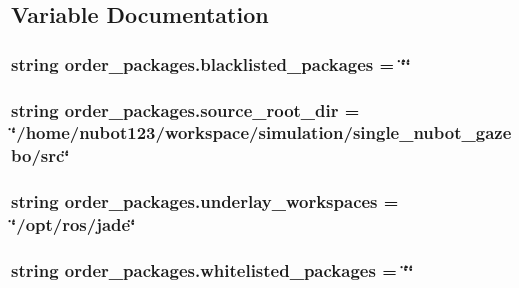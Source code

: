 \subsection{Variable Documentation}
\hypertarget{namespaceorder__packages_a29ea913f00c5a0e81d3c7688e7375507}{
\subsubsection[{blacklisted\-\_\-packages}]{\setlength{\rightskip}{0pt plus 5cm}string order\-\_\-packages.\-blacklisted\-\_\-packages = \char`\"{}\char`\"{}}}\label{namespaceorder__packages_a29ea913f00c5a0e81d3c7688e7375507}
\hypertarget{namespaceorder__packages_aff4fd297841de7fbddc2c0c33a6bab21}{
\subsubsection[{source\-\_\-root\-\_\-dir}]{\setlength{\rightskip}{0pt plus 5cm}string order\-\_\-packages.\-source\-\_\-root\-\_\-dir = \char`\"{}/home/nubot123/workspace/simulation/single\-\_\-nubot\-\_\-gazebo/src\char`\"{}}}\label{namespaceorder__packages_aff4fd297841de7fbddc2c0c33a6bab21}
\hypertarget{namespaceorder__packages_a11d102ff09fd2977b9075c4c722015d2}{
\subsubsection[{underlay\-\_\-workspaces}]{\setlength{\rightskip}{0pt plus 5cm}string order\-\_\-packages.\-underlay\-\_\-workspaces = \char`\"{}/opt/ros/jade\char`\"{}}}\label{namespaceorder__packages_a11d102ff09fd2977b9075c4c722015d2}
\hypertarget{namespaceorder__packages_a84450a73e77dbf3689293b97dcb697a4}{
\subsubsection[{whitelisted\-\_\-packages}]{\setlength{\rightskip}{0pt plus 5cm}string order\-\_\-packages.\-whitelisted\-\_\-packages = \char`\"{}\char`\"{}}}\label{namespaceorder__packages_a84450a73e77dbf3689293b97dcb697a4}

